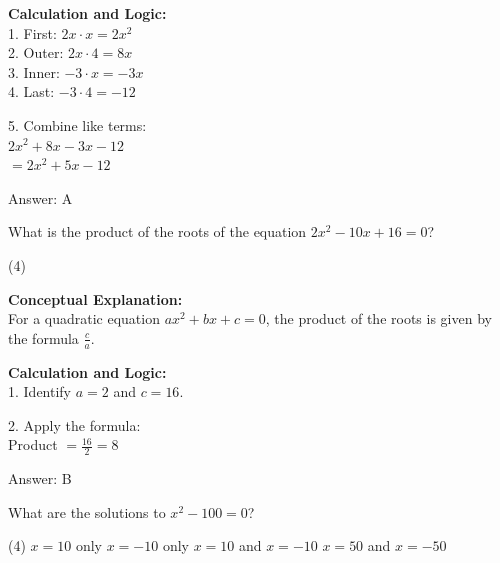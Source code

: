 \documentclass[11pt,paper=a4,answers]{exam}
\begin{document}
\begin{questions}
\begin{solution}
\vspace{15pt}

\textbf{Calculation and Logic:} \\
1. First: $2x \cdot x = 2x^2$ \\
2. Outer: $2x \cdot 4 = 8x$ \\
3. Inner: $-3 \cdot x = -3x$ \\
4. Last: $-3 \cdot 4 = -12$

\vspace{10pt}

5. Combine like terms: \\
   $2x^2 + 8x - 3x - 12$ \\
   $= 2x^2 + 5x - 12$

\vspace{20pt}

Answer: \colorbox{yellow!100}{A}
\end{solution}

\vspace{30pt}

\question
What is the product of the roots of the equation $2x^2 - 10x + 16 = 0$?
\begin{tasks}(4)
\end{tasks}

\begin{solution}
\textbf{Conceptual Explanation:} \\
For a quadratic equation $ax^2 + bx + c = 0$, the product of the roots is given by the formula $\frac{c}{a}$.

\vspace{15pt}

\textbf{Calculation and Logic:} \\
1. Identify $a = 2$ and $c = 16$.

\vspace{10pt}

2. Apply the formula: \\
   Product $= \frac{16}{2} = 8$

\vspace{20pt}

Answer: \colorbox{yellow!100}{B}
\end{solution}

\vspace{30pt}

\question
What are the solutions to $x^2 - 100 = 0$?
\begin{tasks}(4)
    \task $x = 10$ only
    \task $x = -10$ only
    \task $x = 10$ and $x = -10$
    \task $x = 50$ and $x = -50$
\end{tasks}


\end{questions}
\end{document}
